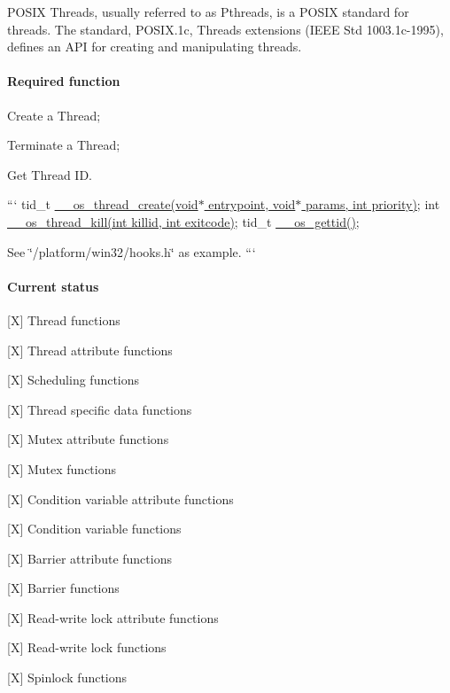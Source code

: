 P\+O\+S\+I\+X Threads, usually referred to as Pthreads, is a P\+O\+S\+I\+X standard for threads. The standard, P\+O\+S\+I\+X.\+1c, Threads extensions (I\+E\+E\+E Std 1003.\+1c-\/1995), defines an A\+P\+I for creating and manipulating threads.

\paragraph*{Required function}


\begin{DoxyItemize}
\item Create a Thread;
\item Terminate a Thread;
\item Get Thread I\+D.
\end{DoxyItemize}

``` tid\+\_\+t \hyperlink{win32_2hooks_8h_a90a2b2b0249a9fde4ff642490f566e34}{\+\_\+\+\_\+os\+\_\+thread\+\_\+create(void$\ast$ entrypoint, void$\ast$ params, int priority)}; int \hyperlink{win32_2hooks_8h_ab48a49c5d6297d7b9023b8796a1c996e}{\+\_\+\+\_\+os\+\_\+thread\+\_\+kill(int killid, int exitcode)}; tid\+\_\+t \hyperlink{posix_2hooks_8h_a20babf330fa9904ff336e8b41720991d}{\+\_\+\+\_\+os\+\_\+gettid()};

See \char`\"{}/platform/win32/hooks.\+h\char`\"{} as example. ```

\paragraph*{Current status}


\begin{DoxyItemize}
\item \mbox{[}X\mbox{]} Thread functions
\item \mbox{[}X\mbox{]} Thread attribute functions
\item \mbox{[}X\mbox{]} Scheduling functions
\item \mbox{[}X\mbox{]} Thread specific data functions
\item \mbox{[}X\mbox{]} Mutex attribute functions
\item \mbox{[}X\mbox{]} Mutex functions
\item \mbox{[}X\mbox{]} Condition variable attribute functions
\item \mbox{[}X\mbox{]} Condition variable functions
\item \mbox{[}X\mbox{]} Barrier attribute functions
\item \mbox{[}X\mbox{]} Barrier functions
\item \mbox{[}X\mbox{]} Read-\/write lock attribute functions
\item \mbox{[}X\mbox{]} Read-\/write lock functions
\item \mbox{[}X\mbox{]} Spinlock functions 
\end{DoxyItemize}